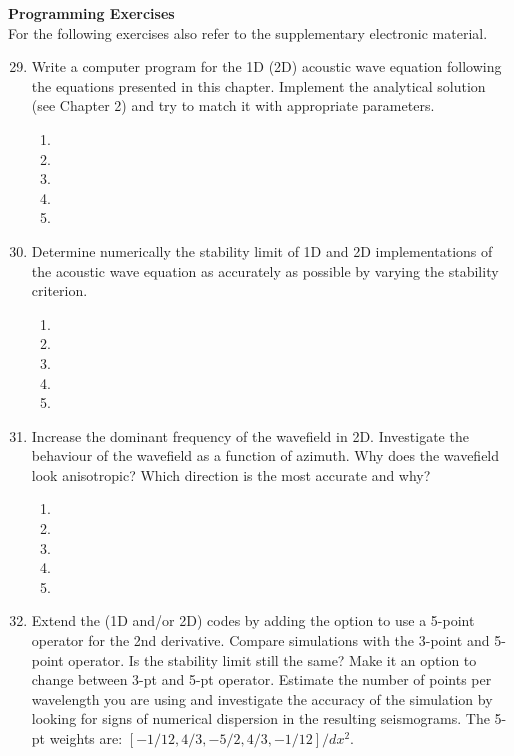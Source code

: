 {\bf Programming Exercises} \\
For the following exercises also refer to the supplementary electronic material. 
\begin{enumerate}
\setcounter{enumi}{28}
\item
Write a computer program for the 1D (2D) acoustic wave equation following the equations presented in this chapter. Implement the analytical solution (see Chapter 2) and try to match it with appropriate parameters. 
\begin{enumerate}
\item[]
\item[]
\item[] 
\item[]
\item[] 
\end{enumerate}
\item
Determine numerically the stability limit of 1D and 2D implementations of the acoustic wave equation as accurately as possible by varying the stability criterion.
\begin{enumerate}
\item[]
\item[]
\item[] 
\item[]
\item[] 
\end{enumerate}
\item
Increase the dominant frequency of the wavefield in 2D. Investigate the  behaviour of the wavefield as a function of azimuth. Why does the wavefield look anisotropic? Which direction is the most accurate and why?
\begin{enumerate}
\item[]
\item[]
\item[] 
\item[]
\item[] 
\end{enumerate}
\item
Extend the (1D and/or 2D) codes by adding the option to use a 5-point  operator for the 2nd derivative. Compare simulations with the 3-point and 5-point operator. Is the stability limit still the same? Make it an option to change between 3-pt and 5-pt operator. Estimate the number of points per wavelength you are using and investigate the accuracy of the simulation by looking for signs of numerical dispersion in the resulting seismograms. The 5-pt weights are: $[-1/12, 4/3, -5/2, 4/3, -1/12]/dx^2$. 

\end{enumerate}
